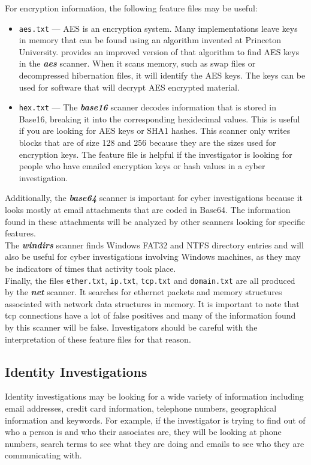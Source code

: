 \documentclass[11pt]{article} %
\begin{document}
For encryption information, the following feature files may be useful:
\begin{itemize}
\item \texttt{aes.txt} --- AES is an encryption system. Many implementations leave keys in memory that can be found using an algorithm invented at Princeton University. \bulk provides an improved version of that algorithm to find AES keys in the  \textbf{\textit{aes}} scanner. When it scans memory, such as swap files or decompressed hibernation files, it will identify the AES keys. The keys can be used for software that will decrypt AES encrypted material. 
\item \texttt{hex.txt} --- The  \textbf{\textit{base16}} scanner decodes information that is stored in Base16, breaking it into the corresponding hexidecimal values. This is useful if you are looking for AES keys or SHA1 hashes. This scanner only writes blocks that are of size 128 and 256 because they are the sizes used for encryption keys. The feature file is helpful if the investigator is looking for people who have emailed encryption keys or hash values in a cyber investigation.
\end{itemize}

Additionally, the  \textbf{\textit{base64}} scanner is important for cyber investigations because it looks mostly at email attachments that are coded in Base64. The information found in these attachments will be analyzed by other scanners looking for specific features.\\

The \textbf{\textit{windirs}} scanner finds Windows FAT32 and NTFS directory entries and will also be useful for cyber investigations involving Windows machines, as they may be indicators of times that activity took place.\\

Finally, the files \texttt{ether.txt}, \texttt{ip.txt}, \texttt{tcp.txt} and \texttt{domain.txt} are all produced by the  \textbf{\textit{net}} scanner. It searches for ethernet packets and memory structures associated with network data structures in memory. It is important to note that tcp connections have a lot of false positives and many of the information found by this scanner will be false. Investigators should be careful with the interpretation of these feature files for that reason.

\subsection{Identity Investigations}
\label{identity}
Identity investigations may be looking for a wide variety of information including email addresses, credit card information, telephone numbers, geographical information and keywords. For example, if the investigator is trying to find out of who a person is and who their associates are, they will be looking at phone numbers, search terms to see what they are doing and emails to see who they are communicating with. \\
\end{document}
